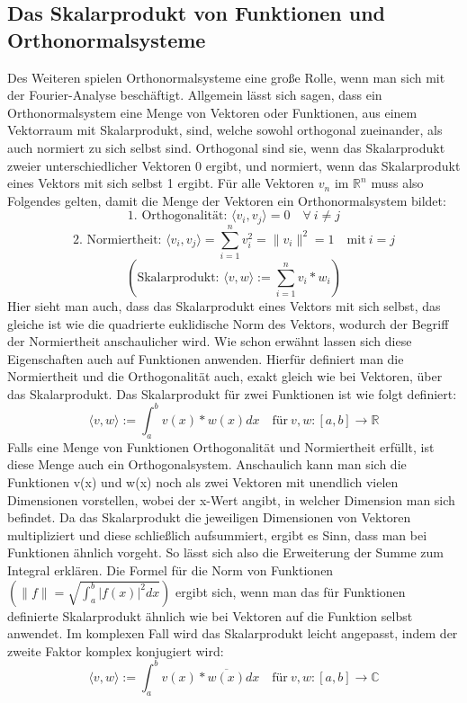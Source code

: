 \documentclass[a4paper,12pt]{article}
\theoremstyle{definition}
\theoremstyle{remark}
\begin{document}
\subsection{Das Skalarprodukt von Funktionen und Orthonormalsysteme}
Des Weiteren spielen Orthonormalsysteme eine große Rolle, wenn man sich mit der Fourier-Analyse beschäftigt. 
Allgemein lässt sich sagen, dass ein Orthonormalsystem eine Menge von Vektoren oder Funktionen, aus einem Vektorraum mit Skalarprodukt, 
sind, welche sowohl orthogonal zueinander, als auch normiert zu sich selbst sind. 
Orthogonal sind sie, wenn das Skalarprodukt zweier unterschiedlicher Vektoren 0 ergibt, und normiert, wenn das Skalarprodukt eines Vektors mit sich selbst 1 ergibt.
Für alle Vektoren $v_n$ im $\mathbb{R}^n$ muss also Folgendes gelten, damit die Menge der Vektoren ein Orthonormalsystem bildet: 
$$\text{1. Orthogonalität: } \langle v_i, v_j\rangle = 0 \quad \forall \:i \neq j $$
$$\text{2. Normiertheit: } \langle v_i, v_j\rangle = \sum_{i=1}^{n}v_i^2 = \|v_i\|^2 = 1 \quad \text{mit} \: i = j$$
$$\left( \text{Skalarprodukt: } \langle v, w\rangle := \sum_{i = 1}^{n}v_i * w_i\right)$$
Hier sieht man auch, dass das Skalarprodukt eines Vektors mit sich selbst, das gleiche 
ist wie die quadrierte euklidische Norm des Vektors, wodurch der Begriff der Normiertheit 
anschaulicher wird. Wie schon erwähnt lassen sich diese Eigenschaften auch auf Funktionen anwenden. 
Hierfür definiert man die Normiertheit und die Orthogonalität auch, exakt gleich wie bei Vektoren, über das Skalarprodukt. Das Skalarprodukt für zwei Funktionen ist wie folgt definiert:
$$\langle v, w \rangle := \int_a^bv{(x)*w(x)dx} \quad \text{für} \: v,w : [a,b] \to \mathbb{R} $$
Falls eine Menge von Funktionen Orthogonalität und Normiertheit erfüllt, ist diese Menge auch ein Orthogonalsystem. 
Anschaulich kann man sich die Funktionen v(x) und w(x) noch als zwei Vektoren mit unendlich 
vielen Dimensionen vorstellen, wobei der x-Wert angibt, in welcher Dimension man sich befindet. 
Da das Skalarprodukt die jeweiligen Dimensionen von Vektoren multipliziert und diese 
schließlich aufsummiert, ergibt es Sinn, dass man bei Funktionen ähnlich vorgeht. 
So lässt sich also die Erweiterung der Summe zum Integral erklären. Die Formel für die 
Norm von Funktionen $\left( \|f\| = \sqrt{\int_a^b{\vert f(x)\vert^2 dx}} \right)$ ergibt sich, wenn man das für Funktionen definierte Skalarprodukt 
ähnlich wie bei Vektoren auf die Funktion selbst anwendet. Im komplexen Fall wird das Skalarprodukt leicht angepasst, 
indem der zweite Faktor komplex konjugiert wird:
$$\langle v,w \rangle := \int_a^b{v(x)*\overline{w(x)}dx} \quad \text{für} \: v,w : [a,b] \to \mathbb{C}$$
\end{document}
